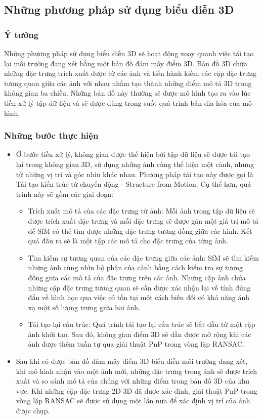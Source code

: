 \subsection{Những phương pháp sử dụng biểu diễn 3D}
\subsubsection*{Ý tưởng}
Những phương pháp sử dụng biểu diễn 3D sẽ hoạt động xoay quanh việc tái tạo lại môi trường đang xét bằng một bản đồ đám mây điểm 3D. Bản đồ 3D chứa những đặc trưng trích xuất được từ các ảnh và tiến hành kiếm các cặp đặc trưng tương quan giữa các ảnh với nhau nhằm tạo thành những điểm mô tả 3D trong không gian ba chiều. Những bản đồ này thường sẽ được mô hình tạo ra vào lúc tiền xử lý tập dữ liệu và sẽ được dùng trong suốt quá trình bản địa hóa của mô hình.
\subsubsection*{Những bước thực hiện}
\begin{itemize}
    \item Ở bước tiền xử lý, không gian được thể hiện bởi tập dữ liệu sẽ được tái tạo lại trong không gian 3D, sử dụng những ảnh cùng thể hiện một cảnh, nhưng từ những vị trí và góc nhìn khác nhau. Phương pháp tái tạo này được gọi là Tái tạo kiến trúc từ chuyển động - Structure from Motion. Cụ thể hơn, quá trình này sẽ gồm các giai đoạn:
          \begin{itemize}
              \item Trích xuất mô tả của các đặc trưng từ ảnh: Mỗi ảnh trong tập dữ liệu sẽ được trích xuất đặc trưng và mỗi đặc trưng sẽ được gán một giá trị mô tả để SfM có thể tìm được những đặc trưng tương đồng giữa các hình. Kết quả đầu ra sẽ là một tập các mô tả cho đặc trưng của từng ảnh.
              \item Tìm kiếm sự tương quan của các đặc trưng giữa các ảnh: SfM sẽ tìm kiếm những ảnh cùng nhìn bộ phận của cảnh bằng cách kiểm tra sự tương đồng giữa các mô tả của đặc trưng trên các ảnh. Những cặp ảnh chứa những cặp đặc trưng tương quan sẽ cần được xác nhận lại về tính đúng đắn về hình học qua việc có tồn tại một cách biến đổi có khả năng ánh xạ một số lượng trưng giữa hai ảnh.
              \item Tái tạo lại cấu trúc: Quá trình tái tạo lại cấu trúc sẽ bắt đầu từ một cặp ảnh khởi tạo. Sau đó, không gian điểm 3D sẽ dần được mở rộng khi các ảnh được thêm tuần tự qua giải thuật PnP trong vòng lặp RANSAC.
          \end{itemize}
    \item Sau khi có được bản đồ đám mây điểm 3D biểu diễn môi trường đang xét, khi mô hình nhận vào một ảnh mới, những đặc trưng trong ảnh sẽ được trích xuất và so sánh mô tả của chúng với những điểm trong bản đồ 3D của khu vực. Khi những cặp đặc trưng 2D-3D đã được xác định, giải thuật PnP trong vòng lặp RANSAC sẽ được sử dụng một lần nữa để xác định vị trí của ảnh được chụp.
\end{itemize}
